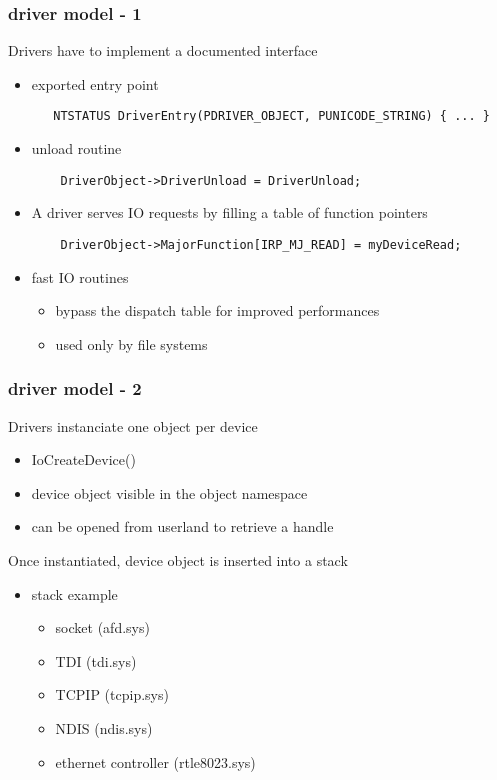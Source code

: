\begin{frame}[containsverbatim]
 \frametitle{driver model - 1}

 Drivers have to implement a documented interface

 \begin{itemize}
  \item exported entry point

  \begin{verbatim}
   NTSTATUS DriverEntry(PDRIVER_OBJECT, PUNICODE_STRING) { ... }
  \end{verbatim}

  \item unload routine
   \begin{verbatim}
    DriverObject->DriverUnload = DriverUnload;
   \end{verbatim}

  \item A driver serves IO requests by filling a table of function pointers
   \begin{verbatim}
    DriverObject->MajorFunction[IRP_MJ_READ] = myDeviceRead;
   \end{verbatim}

  \item fast IO routines
  \begin{itemize}
   \item bypass the dispatch table for improved performances
   \item used only by file systems
  \end{itemize}

 \end{itemize}

\end{frame}


\begin{frame}
 \frametitle{driver model - 2}

 Drivers instanciate one object per device

 \begin{itemize}
  \item IoCreateDevice()
  \item device object visible in the object namespace
  \item can be opened from userland to retrieve a handle
 \end{itemize}

 Once instantiated, device object is inserted into a stack

 \begin{itemize}
  \item stack example
   \begin{itemize}
    \item socket (afd.sys)
    \item TDI (tdi.sys)
    \item TCPIP (tcpip.sys)
    \item NDIS (ndis.sys)
    \item ethernet controller (rtle8023.sys)
   \end{itemize}

 \end{itemize}

\end{frame}

